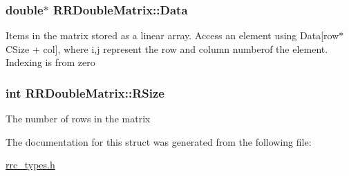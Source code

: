 \subsubsection[{Data}]{\setlength{\rightskip}{0pt plus 5cm}double$\ast$ R\+R\+Double\+Matrix\+::\+Data}\label{struct_r_r_double_matrix_afeaa302597fc935e45634c8bd9e1e4b1}
Items in the matrix stored as a linear array. Access an element using Data\mbox{[}row$\ast$\+C\+Size + col\mbox{]}, where i,j represent the row and column numberof the element. Indexing is from zero \hypertarget{struct_r_r_double_matrix_a674431f97c6ce4a6ef05248a67ea1c54}{}
\subsubsection[{R\+Size}]{\setlength{\rightskip}{0pt plus 5cm}int R\+R\+Double\+Matrix\+::\+R\+Size}\label{struct_r_r_double_matrix_a674431f97c6ce4a6ef05248a67ea1c54}
The number of rows in the matrix 

The documentation for this struct was generated from the following file\+:\begin{DoxyCompactItemize}
\item 
\hyperlink{rrc__types_8h}{rrc\+\_\+types.\+h}\end{DoxyCompactItemize}
